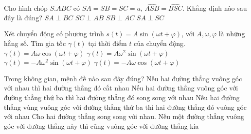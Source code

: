 \begin{ex}%
    Cho hình chóp $S.ABC$ có $SA=SB=SC=a$, $\widehat{ASB}=\widehat{BSC}$. Khẳng định nào sau đây là đúng?
    \choice
    {$SA\perp BC$}
    {$SC\perp AB$}
    {\True $SB\perp AC$}
    {$SA\perp SC$}
\end{ex}
\begin{ex}%
    Xét chuyển động có phương trình $s(t)=A\sin \left(\omega t+\varphi \right)$, với $A,\omega,\varphi $ là những hằng số. Tìm gia tốc $\gamma(t)$ tại thời điểm $t$ của chuyển động.
    \choice
    {$\gamma (t)=A\omega \cos \left(\omega t+\varphi \right)$}
    {$\gamma (t)=A\omega^2\sin \left(\omega t+\varphi \right)$}
    {\True $\gamma (t)=-A\omega^2\sin \left(\omega t+\varphi \right)$}
    {$\gamma (t)=-A\omega \cos \left(\omega t+\varphi \right)$}
\end{ex}
\begin{ex}%
    Trong không gian, mệnh đề nào sau đây đúng?
    \choice
    {Nếu hai đường thẳng vuông góc với nhau thì hai đường thẳng đó cắt nhau}
    {Nếu hai đường thẳng vuông góc với đường thẳng thứ ba thì hai đường thẳng đó song song với nhau}
    {Nếu hai đường thẳng vùng vuông góc với đường thẳng thứ ba thì hai đường thẳng đó vuông góc với nhau}
    {\True Cho hai đường thẳng song song với nhau. Nếu một đường thẳng vuông góc với đường thẳng này thì cũng vuông góc với đường thẳng kia}
\end{ex}
